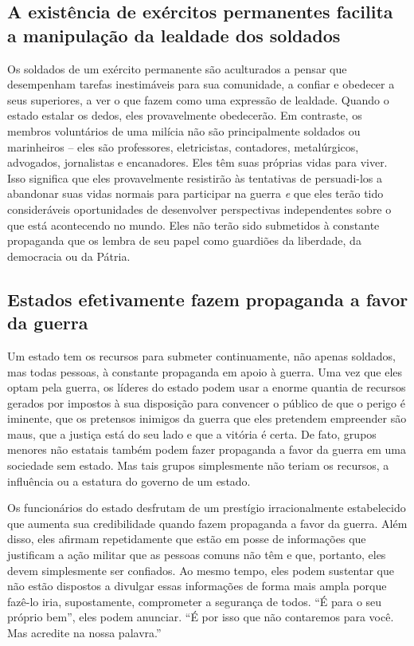 \subsection*{A existência de exércitos permanentes facilita a manipulação da lealdade dos soldados}

Os soldados de um exército permanente são aculturados a pensar que desempenham tarefas inestimáveis para sua comunidade, a confiar e obedecer a seus superiores, a ver o que fazem como uma expressão de lealdade. Quando o estado estalar os dedos, eles provavelmente obedecerão. Em contraste, os membros voluntários de uma milícia não são principalmente soldados ou marinheiros -- eles são professores, eletricistas, contadores, metalúrgicos, advogados, jornalistas e encanadores. Eles têm suas próprias vidas para viver. Isso significa que eles provavelmente resistirão às tentativas de persuadi-los a abandonar suas vidas normais para participar na guerra \emph{e} que eles terão tido consideráveis oportunidades de desenvolver perspectivas independentes sobre o que está acontecendo no mundo. Eles não terão sido submetidos à constante propaganda que os lembra de seu papel como guardiões da liberdade, da democracia ou da Pátria.

\subsection*{Estados efetivamente fazem propaganda a favor da guerra}

Um estado tem os recursos para submeter continuamente, não apenas soldados, mas todas pessoas, à constante propaganda em apoio à guerra. Uma vez que eles optam pela guerra, os líderes do estado podem usar a enorme quantia de recursos gerados por impostos à sua disposição para convencer o público de que o perigo é iminente, que os pretensos inimigos da guerra que eles pretendem empreender são maus, que a justiça está do seu lado e que a vitória é certa. De fato, grupos menores não estatais também podem fazer propaganda a favor da guerra em uma sociedade sem estado. Mas tais grupos simplesmente não teriam os recursos, a influência ou a estatura do governo de um estado.

Os funcionários do estado desfrutam de um prestígio irracionalmente estabelecido que aumenta sua credibilidade quando fazem propaganda a favor da guerra. Além disso, eles afirmam repetidamente que estão em posse de informações que justificam a ação militar que as pessoas comuns não têm e que, portanto, eles devem simplesmente ser confiados. Ao mesmo tempo, eles podem sustentar que não estão dispostos a divulgar essas informações de forma mais ampla porque fazê-lo iria, supostamente, comprometer a segurança de todos. ``É para o seu próprio bem'', eles podem anunciar. ``É por isso que não contaremos para você. Mas acredite na nossa palavra.''

